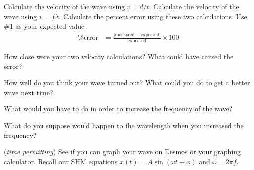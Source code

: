 \documentclass[10pt]{exam}
\begin{document}
\begin{questions}

  \question
    Calculate the velocity of the wave using $v=d/t$. \vs 
  \question 
    Calculate the velocity of the wave using $v=f\lambda$. \vs 
  \question 
    Calculate the percent error using these two calculations.  Use \#1 as your expected value.
    \begin{align*}
      \text{\% error} &=  
      \frac{
        \left|\text{measured}-\text{expected}\right|
        }{
          \text{expected}
        } 
      \times 100
    \end{align*}
    \vs



    \question
      How close were your two velocity calculations?  What could have caused the error?
      \vs 

    \question
      How well do you think your wave turned out?  What could you do to get a better wave next time?
      \vs
    
    \question
      What would you have to do in order to increase the frequency of the wave?
      \vs 

    \question
      What do you suppose would happen to the wavelength when you increased the frequency?
      \vs


    \question 
      (\emph{time permitting}) See if you can graph your wave on Desmos or your graphing calculator.  Recall our SHM equations $x(t)=A\sin(\omega t + \phi)$ and $\omega = 2\pi f$.
\end{questions}

\pagebreak
\end{document}
